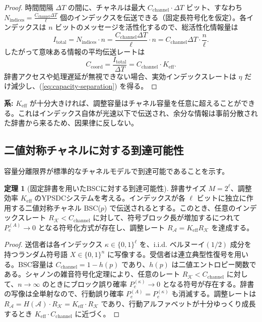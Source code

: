 \documentclass[12pt,a4paper]{article}
\theoremstyle{definition}
\newtheorem{theorem}{定理}[section]
\theoremstyle{remark}
\newcommand{\Keff}{K_{\mathrm{eff}}}
\begin{document}
	\begin{proof}
		時間間隔 $\Delta T$ の間に、チャネルは最大 $C_{\text{channel}} \cdot \Delta T$ ビット、すなわち $N_{\text{indices}} = \frac{C_{\text{channel}} \Delta T}{\ell}$ 個のインデックスを伝送できる（固定長符号化を仮定）。各インデックスは $n$ ビットのメッセージを活性化するので、総活性化情報量は
		\[
		I_{\text{total}} = N_{\text{indices}} \cdot n = \frac{C_{\text{channel}} \Delta T}{\ell} \cdot n = C_{\text{channel}} \Delta T \cdot \frac{n}{\ell}.
		\]
		したがって意味ある情報の平均伝送レートは
		\[
		C_{\text{coord}} = \frac{I_{\text{total}}}{\Delta T} = C_{\text{channel}} \cdot \Keff.
		\]
		辞書アクセスや処理遅延が無視できない場合、実効インデックスレートは $\eta$ だけ減少し、(\ref{eq:capacity-separation}) を得る。
	\end{proof}
	
	\noindent
	\textbf{系:} $\Keff$ が十分大きければ、調整容量はチャネル容量を任意に超えることができる。これはインデックス自体が光速以下で伝送され、余分な情報は事前分散された辞書から来るため、因果律に反しない。
	
	\subsection{二値対称チャネルに対する到達可能性}
	\label{subsec:BSC-achievability}
	
	容量分離限界が標準的なチャネルモデルで到達可能であることを示す。
	
	\begin{theorem}[固定辞書を用いたBSCに対する到達可能性]
		辞書サイズ $M = 2^\ell$、調整効率 $K_{\mathrm{eff}}$ のYPSDCシステムを考える。インデックスが各 $\ell$ ビットに独立に作用する二値対称チャネル BSC($p$) で伝送されるとする。このとき、任意のインデックスレート $R_{\mathcal{K}} < C_{\mathrm{channel}}$ に対して、符号ブロック長が増加するにつれて $P_e^{(A)} \to 0$ となる符号化方式が存在し、調整レート $R_{\mathcal{A}} = K_{\mathrm{eff}} R_{\mathcal{K}}$ を達成する。
	\end{theorem}
	
	\begin{proof}
		送信者は各インデックス $\kappa \in \{0,1\}^\ell$ を、i.i.d. ベルヌーイ$(1/2)$ 成分を持つランダム符号語 $X \in \{0,1\}^n$ に写像する。受信者は連立典型性復号を用いる。BSC容量は $C_{\mathrm{channel}} = 1 - h(p)$ であり、$h(p)$ は二値エントロピー関数である。シャノンの雑音符号化定理により、任意のレート $R_{\mathcal{K}} < C_{\mathrm{channel}}$ に対して、$n \to \infty$ のときにブロック誤り確率 $P_e^{(\kappa)} \to 0$ となる符号が存在する。辞書の写像は全単射なので、行動誤り確率 $P_e^{(A)} = P_e^{(\kappa)}$ も消滅する。調整レートは $R_{\mathcal{A}} = H(\mathcal{A}) \cdot R_{\mathcal{K}} = K_{\mathrm{eff}} \cdot R_{\mathcal{K}}$ であり、行動アルファベットが十分ゆっくり成長するとき $K_{\mathrm{eff}} \cdot C_{\mathrm{channel}}$ に近づく。
	\end{proof}
	
\end{document}
